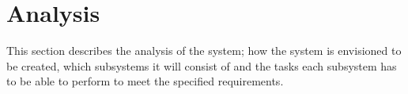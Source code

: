 
\chapter{Analysis}

This section describes the analysis of the system; how the system is envisioned to be created, which subsystems it will consist of and the tasks each subsystem has to be able to perform to meet the specified requirements.


